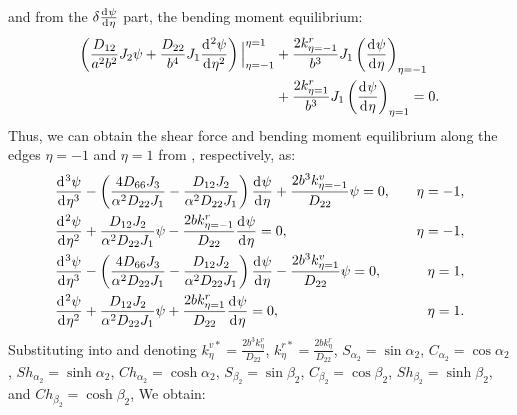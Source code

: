 \documentclass[preprint,12pt]{elsarticle}
\newcommand{\id}{\mathrm{d}\mkern1mu}
\begin{document}
%
and from the \( \delta \frac{\id \psi}{\id \eta} \) part, the bending moment equilibrium:
%
\begin{equation}\label{eq:inertial_forcey2}	
 \begin{split}
 	\left( \frac{D_{12}}{a^2b^2} J_2 \psi + \frac{D_{22}}{b^4} J_1 \frac{\id^2 \psi}{\id \eta^2} \right) 
 	\Big|^{\eta=1}_{\eta=-1} 
 	&+ \frac{2k^r_{\eta=-1}}{b^3} J_1 \left( \frac{\id \psi}{\id \eta} \right)_{\eta=-1} \\
 	&+ \frac{2k^r_{\eta=1}}{b^3} J_1 \left( \frac{\id \psi}{\id \eta} \right)_{\eta=1}=0.
 \end{split}
\end{equation}
%
Thus, we can obtain the shear force and bending moment equilibrium along the edges \( \eta = -1 \) and \( \eta = 1 \) from , respectively, as:
%
\begin{subequations}\label{eq:boundaryy}
	\begin{align}
		&  \frac{\id^3 \psi}{\id \eta^3}-\left( \frac{4D_{66}J_3}{\alpha^2D_{22}J_1}  - \frac{D_{12}J_2}{\alpha^2D_{22}J_1}  \right) \frac{\id \psi}{\id \eta} 
		+\frac{2b^3k^v_{\eta=-1}}{D_{22}}\psi=0,\quad &\eta=-1,\\
		& \frac{\id^2 \psi}{\id \eta^2}+\frac{D_{12}J_2}{\alpha^2D_{22}J_1} \psi -\frac{2bk^r_{\eta=-1}}{D_{22}}\frac{\id\psi }{\id \eta}=0,\quad &\eta=-1,\\
		&  \frac{\id^3 \psi}{\id \eta^3}-\left( \frac{4D_{66}J_3}{\alpha^2D_{22}J_1}  - \frac{D_{12}J_2}{\alpha^2D_{22}J_1}  \right) \frac{\id \psi}{\id \eta} 
		-\frac{2b^3k^v_{\eta=1}}{D_{22}}\psi=0,\quad &\eta=1,\\
		&\frac{\id^2 \psi}{\id \eta^2}+\frac{D_{12}J_2}{\alpha^2D_{22}J_1} \psi +\frac{2bk^r_{\eta=1}}{D_{22}}\frac{\id\psi }{\id \eta}=0,\quad &\eta=1.
	\end{align}
\end{subequations}
%
Substituting  into  and denoting
\( k^{v*}_{\eta} = \frac{2b^3 k^v_{\eta}}{D_{22}} \), 
\( k^{r*}_{\eta} = \frac{2b k^r_{\eta}}{D_{22}} \), 
\( S_{\alpha_2}=\sin\alpha_2  \), 
\( C_{\alpha_2}=\cos\alpha_2  \), 
\( Sh_{\alpha_2}=\sinh\alpha_2  \), 
\( Ch_{\alpha_2}=\cosh\alpha_2 \), 
\( S_{\beta_2}=\sin\beta_2  \), 
\( C_{\beta_2}=\cos\beta_2  \), 
\( Sh_{\beta_2}=\sinh\beta_2 \), and 
\(Ch_{\beta_2}= \cosh\beta_2 \), 
We obtain:
%
\end{document}
